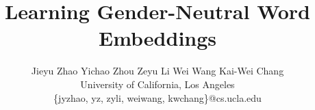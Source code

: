 \documentclass[11pt,a4paper]{article}
\title{Learning Gender-Neutral Word Embeddings}
\author{Jieyu Zhao  \qquad
  Yichao Zhou    \qquad
  Zeyu Li \qquad
  Wei Wang \qquad
  Kai-Wei Chang\\
  University of California, Los Angeles \\
  \{jyzhao, yz, zyli, weiwang, kwchang\}@cs.ucla.edu
  }
\date{}
\begin{document}
\maketitle
\begin{abstract}

\end{abstract}





% 











% 


\end{document}
